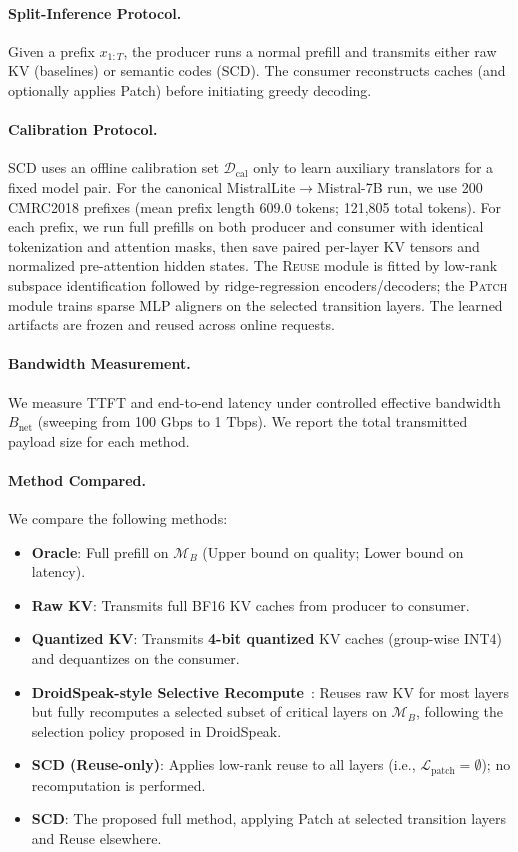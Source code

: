 \documentclass{article}
\theoremstyle{plain}
\theoremstyle{definition}
\theoremstyle{remark}
\begin{document}
\paragraph{Split-Inference Protocol.}
Given a prefix $x_{1:T}$, the producer runs a normal prefill and transmits either raw KV (baselines) or semantic codes (SCD).
The consumer reconstructs caches (and optionally applies Patch) before initiating greedy decoding.

\paragraph{Calibration Protocol.}
SCD uses an offline calibration set $\mathcal{D}_{\mathrm{cal}}$ only to learn auxiliary translators for a fixed model pair.
For the canonical MistralLite$\to$Mistral-7B run, we use 200 CMRC2018 prefixes (mean prefix length 609.0 tokens; 121,805 total tokens).
For each prefix, we run full prefills on both producer and consumer with identical tokenization and attention masks, then save paired per-layer KV tensors and normalized pre-attention hidden states.
The \textsc{Reuse} module is fitted by low-rank subspace identification followed by ridge-regression encoders/decoders; the \textsc{Patch} module trains sparse MLP aligners on the selected transition layers.
The learned artifacts are frozen and reused across online requests.

\paragraph{Bandwidth Measurement.}
We measure TTFT and end-to-end latency under controlled effective bandwidth $B_{\mathrm{net}}$ (sweeping from 100 Gbps to 1 Tbps).
We report the total transmitted payload size for each method.

\paragraph{Method Compared.}
We compare the following methods:
\begin{itemize}
  \item \textbf{Oracle}: Full prefill on $\mathcal{M}_B$ (Upper bound on quality; Lower bound on latency).
  \item \textbf{Raw KV}: Transmits full BF16 KV caches from producer to consumer.
  \item \textbf{Quantized KV}: Transmits \textbf{4-bit quantized} KV caches (group-wise INT4) and dequantizes on the consumer.
  \item \textbf{DroidSpeak-style Selective Recompute}~\citep{liu2024droidspeak}: Reuses raw KV for most layers but fully recomputes a selected subset of critical layers on $\mathcal{M}_B$, following the selection policy proposed in DroidSpeak.
  \item \textbf{SCD (Reuse-only)}: Applies low-rank reuse to all layers (i.e., $\mathcal{L}_{\mathrm{patch}}=\emptyset$); no recomputation is performed.
  \item \textbf{SCD}: The proposed full method, applying Patch at selected transition layers and Reuse elsewhere.
\end{itemize}
\end{document}
